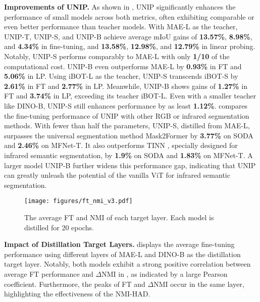 \textbf{Improvements of UNIP.} As shown in , UNIP significantly enhances the performance of small models across both metrics, often exhibiting comparable or even better performance than teacher models. With MAE-L as the teacher, UNIP-T, UNIP-S, and UNIP-B achieve average mIoU gains of \textbf{13.57\%}, \textbf{8.98\%}, and \textbf{4.34\%} in fine-tuning, and \textbf{13.58\%}, \textbf{12.98\%}, and \textbf{12.79\%} in linear probing. Notably, UNIP-S performs comparably to MAE-L with only \textbf{1/10} of the computational cost. UNIP-B even outperforms MAE-L by \textbf{0.93\%} in FT and \textbf{5.06\%} in LP. Using iBOT-L as the teacher, UNIP-S transcends iBOT-S by \textbf{2.61\%} in FT and \textbf{2.77\%} in LP. Meanwhile, UNIP-B shows gains of \textbf{1.27\%} in FT and \textbf{3.74\%} in LP, exceeding its teacher iBOT-L. Even with a smaller teacher like DINO-B, UNIP-S still enhances performance by as least \textbf{1.12\%}.  compares the fine-tuning performance of UNIP with other RGB or infrared segmentation methods. With fewer than half the parameters, UNIP-S, distilled from MAE-L, surpasses the universal segmentation method Mask2Former \citep{mask2former} by \textbf{3.77\%} on SODA and \textbf{2.46\%} on MFNet-T. It also outperforms TINN \citep{tinn}, specially designed for infrared semantic segmentation, by \textbf{1.9\%} on SODA and \textbf{1.83\%} on MFNet-T. A larger model UNIP-B further widens this performance gap, indicating that UNIP can greatly unleash the potential of the vanilla ViT for infrared semantic segmentation.


\begin{wrapfigure}{r}{0.51\textwidth}
\vspace{-10pt}
\centering
\texttt{[image: figures/ft\_nmi\_v3.pdf]}
\vspace{-22pt}
\caption{The average FT and NMI of each target layer. Each model is distilled for 20 epochs.}
\label{fig:ft_nmi}
\vspace{-11pt}
\end{wrapfigure}

\textbf{Impact of Distillation Target Layers.}  displays the average fine-tuning performance using different layers of MAE-L and DINO-B as the distillation target layer. Notably, both models exhibit a strong positive correlation between average FT performance and $\Delta$NMI in , as indicated by a large Pearson coefficient. Furthermore, the peaks of FT and $\Delta$NMI occur in the same layer, highlighting the effectiveness of the NMI-HAD.


